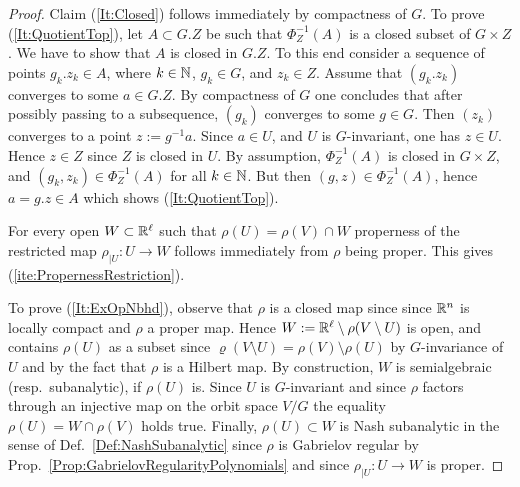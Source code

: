  \begin{proof} Claim (\ref{It:Closed}) follows immediately by compactness of $G$.
   To prove (\ref{It:QuotientTop}), let $A\subset G.Z$ be such that   $\Phi_Z^{-1}(A)$ is a 
   closed subset of $G\times Z$. We have to show that $A$ is closed in $G.Z$.
   To this end consider a sequence of points $ g_k.z_k \in A$, where $k\in \mathbb{N}$, $g_k \in G$, and $z_k\in Z$.
   Assume that $(g_k.z_k)$ converges to some $a\in G.Z$. By compactness of $G$ one concludes that after 
   possibly passing to a subsequence, $(g_k)$ converges to some $g\in G$. Then $(z_k)$ converges to a
   point $z:= g^{-1} a$. Since $a\in U$, and $U$ is $G$-invariant, one has $z\in U$. Hence $z\in Z$ since
   $Z$ is closed in $U$.  By assumption, $\Phi_Z^{-1}(A)$ is closed in $G\times Z$, and 
   $(g_k,z_k) \in\Phi_Z^{-1}(A)$ for all $k\in \mathbb{N}$. But then $(g,z) \in \Phi_Z^{-1}(A)$, hence 
   $a = g.z \in A$ which shows (\ref{It:QuotientTop}).
  
   For every open $W \subset \mathbb{R}^\ell$ such that $\rho (U) = \rho (V) \cap W $ properness of 
   the restricted map $\rho_{|U} : U \to W$ follows immediately from $\rho$ being proper. 
   This gives (\ref{ite:PropernessRestriction}).
   
  To prove (\ref{It:ExOpNbhd}), observe that $\rho$ is a closed map since 
  since $\mathbb{R}^n$ is locally compact and $\rho$ a proper map. Hence 
  $W := \mathbb{R}^\ell \setminus \rho (V\setminus U)$ is open, and contains $\rho (U)$ as a 
  subset since $ \varrho (V\setminus U)  =\rho (V) \setminus \rho (U)$ by $G$-invariance of $U$
  and by the fact that $\rho$ is a Hilbert map. 
  By construction, $W$ is semialgebraic (resp.~subanalytic), if $\rho (U)$ is. 
  Since $U$ is $G$-invariant and since $\rho$ factors through an injective map on the orbit space $V/G$ 
  the equality  $\rho (U) = W \cap \rho (V)$ holds true.
  Finally, $\rho (U) \subset W$ is Nash subanalytic in the sense of Def.~\ref{Def:NashSubanalytic}
  since $\rho$ is Gabrielov regular by Prop.~\ref{Prop:GabrielovRegularityPolynomials}
  and since  $\rho_{|U} : U \to W$ is proper. 
\end{proof}



